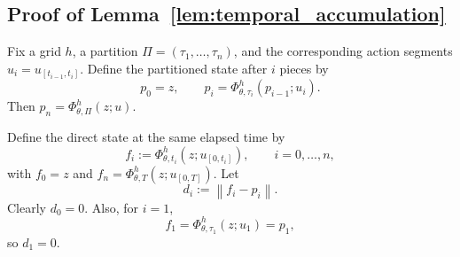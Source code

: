 \documentclass{article}
\theoremstyle{plain}
\theoremstyle{definition}
\theoremstyle{remark}
\newcommand{\PhiOp}{\Phi}
\newcommand{\norm}[1]{\left\lVert #1 \right\rVert}
\begin{document}
\subsection{Proof of Lemma~\ref{lem:temporal_accumulation}}
\label{app:proof_temporal}

Fix a grid $h$, a partition $\Pi=(\tau_1,\ldots,\tau_n)$, and the corresponding action segments $u_i=u_{[t_{i-1},t_i]}$. Define the partitioned state after $i$ pieces by
\begin{equation}
p_0=z,
\qquad
p_i=\PhiOp^{h}_{\theta,\tau_i}(p_{i-1};u_i).
\label{eq:temporal_p_recursion}
\end{equation}
Then $p_n=\PhiOp^{h}_{\theta,\Pi}(z;u)$.

Define the direct state at the same elapsed time by
\begin{equation}
f_i
:=
\PhiOp^{h}_{\theta,t_i}(z;u_{[0,t_i]}),
\qquad i=0,\ldots,n,
\label{eq:temporal_f_definition}
\end{equation}
with $f_0=z$ and $f_n=\PhiOp^{h}_{\theta,T}(z;u_{[0,T]})$. Let
\begin{equation}
d_i:=\norm{f_i-p_i}.
\end{equation}
Clearly $d_0=0$. Also, for $i=1$,
\begin{equation}
f_1=\PhiOp^{h}_{\theta,\tau_1}(z;u_1)=p_1,
\end{equation}
so $d_1=0$.
\end{document}
